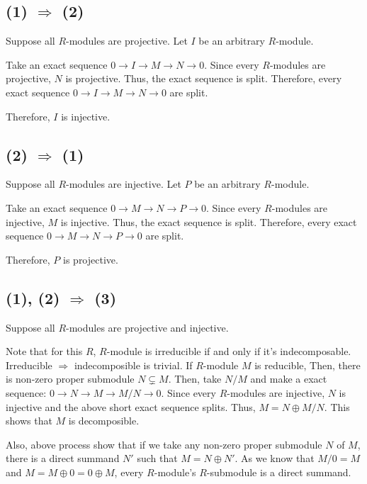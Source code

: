 \subsection*{(1) \(\Rightarrow\) (2)}

Suppose all \(R\)-modules are projective.
Let \(I\) be an arbitrary \(R\)-module.

Take an exact sequence \(0 \to I \to M \to N \to 0\).
Since every \(R\)-modules are projective, \(N\) is projective.
Thus, the exact sequence is split.
Therefore, every exact sequence \(0 \to I \to M \to N \to 0\) are split.

Therefore, \(I\) is injective.
\qedsq

\subsection*{(2) \(\Rightarrow\) (1)}

Suppose all \(R\)-modules are injective.
Let \(P\) be an arbitrary \(R\)-module.

Take an exact sequence \(0 \to M \to N \to P \to 0\).
Since every \(R\)-modules are injective, \(M\) is injective.
Thus, the exact sequence is split.
Therefore, every exact sequence \(0 \to M \to N \to P \to 0\) are split.

Therefore, \(P\) is projective.
\qedsq

\subsection*{(1), (2) \(\Rightarrow\) (3)}

Suppose all \(R\)-modules are projective and injective.

Note that for this \(R\),
\(R\)-module is irreducible if and only if it's indecomposable.
Irreducible \(\Rightarrow\) indecomposible is trivial.
If \(R\)-module \(M\) is reducible,
Then, there is non-zero proper submodule \(N \subsetneq M\).
Then, take \(N / M\) and make a exact sequence:
\(0 \to N \to M \to M/N \to 0\).
Since every \(R\)-modules are injective, \(N\) is injective and
the above short exact sequence splits.
Thus, \(M = N \oplus M/N\).
This shows that \(M\) is decomposible.

Also, above process show that if we take any non-zero proper submodule \(N\)
of \(M\), there is a direct summand \(N'\) such that \(M = N \oplus N'\).
As we know that \(M/0 = M\) and \(M = M \oplus 0 = 0 \oplus M\),
every \(R\)-module's \(R\)-submodule is a direct summand.

